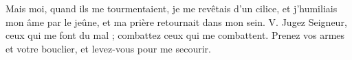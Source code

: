 Mais moi, quand ils me tourmentaient, je me revêtais d’un cilice, et j’humiliais mon âme par le jeûne, et ma prière retournait dans mon sein.
\versseparator
V. Jugez Seigneur, ceux qui me font du mal ; combattez ceux qui me combattent. Prenez vos armes et votre bouclier, et levez-vous pour me secourir.
